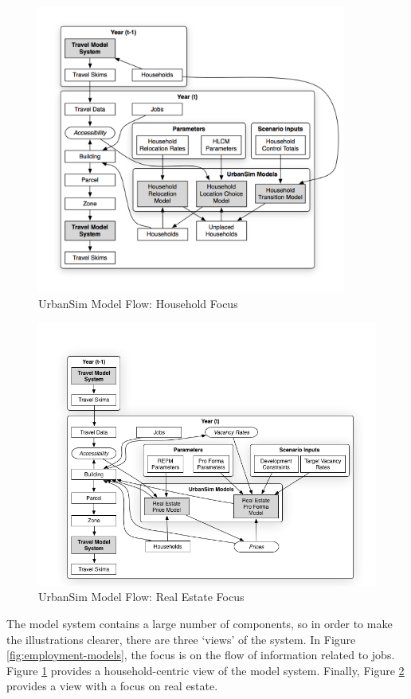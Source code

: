 \begin{figure}[h]
\center
 \includegraphics[width=4in]{graphics/ParcelHouseholdModel.png}
\caption{UrbanSim Model Flow: Household Focus}
\label{fig:household-models}
\end{figure}


\begin{figure}[h]
\center
 \includegraphics[width=5.0in]{graphics/ParcelRealEstateModel.png}
\caption{UrbanSim Model Flow: Real Estate Focus}
\label{fig:parcel-models}
\end{figure}

The model
system contains a large number of components, so in order to make the illustrations clearer,
there are three `views' of the system.  In Figure \ref{fig:employment-models}, the focus is on the
flow of information related to jobs.  Figure \ref{fig:household-models} provides a household-centric
view of the model system.  Finally, Figure \ref{fig:parcel-models} provides a view with a focus on
real estate.

